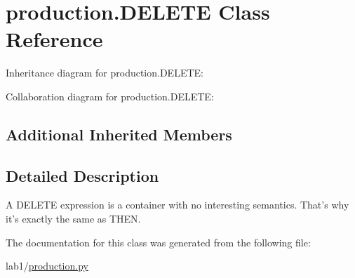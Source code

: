 \hypertarget{classproduction_1_1_d_e_l_e_t_e}{}\section{production.\+D\+E\+L\+E\+T\+E Class Reference}
\label{classproduction_1_1_d_e_l_e_t_e}


Inheritance diagram for production.\+D\+E\+L\+E\+T\+E\+:


Collaboration diagram for production.\+D\+E\+L\+E\+T\+E\+:
\subsection*{Additional Inherited Members}


\subsection{Detailed Description}
\begin{DoxyVerb}A DELETE expression is a container with no interesting
semantics. That's why it's exactly the same as THEN.
\end{DoxyVerb}
 

The documentation for this class was generated from the following file\+:\begin{DoxyCompactItemize}
\item 
lab1/\hyperlink{production_8py}{production.\+py}\end{DoxyCompactItemize}
